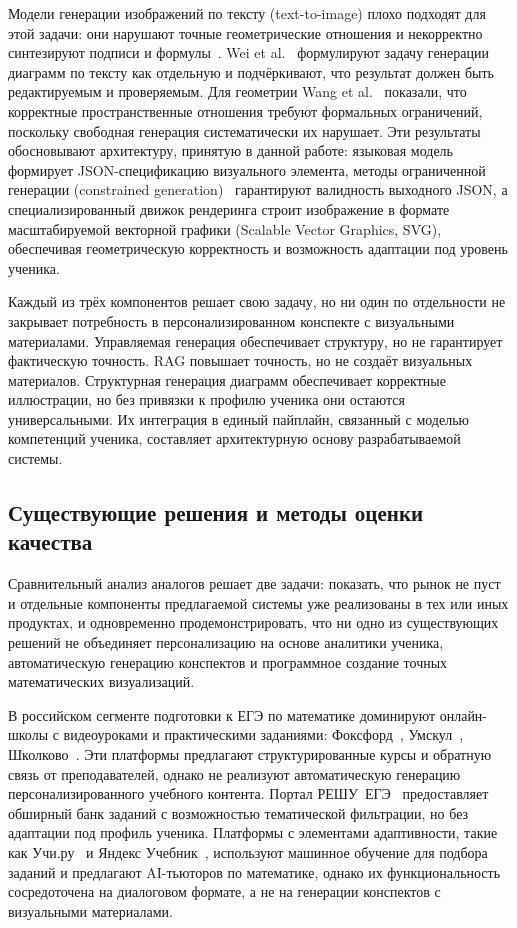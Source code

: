 Модели генерации изображений по тексту (text-to-image) плохо подходят для этой задачи: они нарушают точные геометрические отношения и некорректно синтезируют подписи и формулы~\cite{Bosheah2025}. Wei et al.~\cite{Wei2025TextToDiagram} формулируют задачу генерации диаграмм по тексту как отдельную и подчёркивают, что результат должен быть редактируемым и проверяемым. Для геометрии Wang et al.~\cite{Wang2025MagicGeo} показали, что корректные пространственные отношения требуют формальных ограничений, поскольку свободная генерация систематически их нарушает. Эти результаты обосновывают архитектуру, принятую в данной работе: языковая модель формирует JSON-спецификацию визуального элемента, методы ограниченной генерации (constrained generation)~\cite{Willard2023Outlines} гарантируют валидность выходного JSON, а специализированный движок рендеринга строит изображение в формате масштабируемой векторной графики (Scalable Vector Graphics, SVG), обеспечивая геометрическую корректность и возможность адаптации под уровень ученика.

Каждый из трёх компонентов решает свою задачу, но ни один по отдельности не закрывает потребность в персонализированном конспекте с визуальными материалами. Управляемая генерация обеспечивает структуру, но не гарантирует фактическую точность. RAG повышает точность, но не создаёт визуальных материалов. Структурная генерация диаграмм обеспечивает корректные иллюстрации, но без привязки к профилю ученика они остаются универсальными. Их интеграция в единый пайплайн, связанный с моделью компетенций ученика, составляет архитектурную основу разрабатываемой системы.


\subsection{Существующие решения и методы оценки качества}
\label{sec:analogs}

Сравнительный анализ аналогов решает две задачи: показать, что рынок не пуст и отдельные компоненты предлагаемой системы уже реализованы в тех или иных продуктах, и одновременно продемонстрировать, что ни одно из существующих решений не объединяет персонализацию на основе аналитики ученика, автоматическую генерацию конспектов и программное создание точных математических визуализаций.

В российском сегменте подготовки к ЕГЭ по математике доминируют онлайн-школы с видеоуроками и практическими заданиями: Фоксфорд~\cite{Foxford2025}, Умскул~\cite{Umschool2025}, Школково~\cite{Shkolkovo2025}. Эти платформы предлагают структурированные курсы и обратную связь от преподавателей, однако не реализуют автоматическую генерацию персонализированного учебного контента. Портал РЕШУ~ЕГЭ~\cite{ReshuEGE2025} предоставляет обширный банк заданий с возможностью тематической фильтрации, но без адаптации под профиль ученика. Платформы с элементами адаптивности, такие как Учи.ру~\cite{UchiRu2025} и Яндекс Учебник~\cite{YandexAITutor2025}, используют машинное обучение для подбора заданий и предлагают AI-тьюторов по математике, однако их функциональность сосредоточена на диалоговом формате, а не на генерации конспектов с визуальными материалами.

